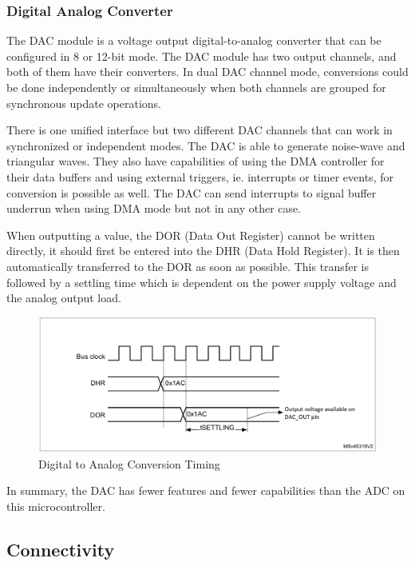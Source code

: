 \subsubsection{Digital Analog Converter}

The DAC module is a voltage output digital-to-analog converter that can be configured in 8 or 12-bit mode. The DAC module has two output channels, and both of them have their converters. In dual DAC channel mode, conversions could be done independently or simultaneously when both channels are grouped for synchronous update operations.\cite{DACDescription}

There is one unified interface but two different DAC channels that can work in synchronized or independent modes. The DAC is able to generate noise-wave and triangular waves. They also have capabilities of using the DMA controller for their data buffers and using external triggers, ie. interrupts or timer events, for conversion is possible as well. The DAC can send interrupts to signal buffer underrun when using DMA mode but not in any other case.

When outputting a value, the DOR (Data Out Register) cannot be written directly, it should first be entered into the DHR (Data Hold Register). It is then automatically transferred to the DOR as soon as possible. This transfer is followed by a settling time which is dependent on the power supply voltage and the analog output load.

\begin{figure}[!ht]
    \centering
    \includegraphics[width=150mm, keepaspectratio]{figures/dac-timing.png}
    \caption{Digital to Analog Conversion Timing\cite{DACTime}}
    \label{fig:dac-timing}
\end{figure}

In summary, the DAC has fewer features and fewer capabilities than the ADC on this microcontroller.

\subsection{Connectivity}

